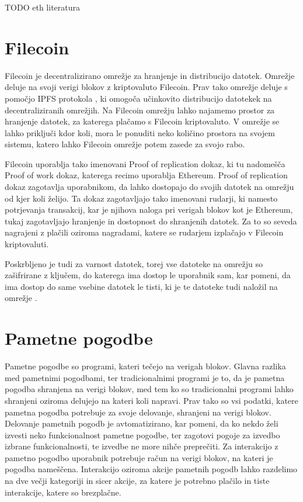 \documentclass[a4paper,12pt,openright]{book}
\begin{document}
TODO eth literatura

\section{Filecoin}
Filecoin je decentralizirano omrežje za hranjenje in distribucijo datotek.
Omrežje deluje na svoji verigi blokov z kriptovaluto Filecoin.
Prav tako omrežje deluje s pomočjo IPFS protokola \cite{IPFS}, ki omogoča učinkovito distribucijo datotekek na decentraliziranih omrežjih.
Na Filecoin omrežju lahko najamemo prostor za hranjenje datotek, za katerega plačamo s Filecoin kriptovaluto.
V omrežje se lahko priključi kdor koli, mora le ponuditi neko količino prostora na svojem sistemu, katero lahko Filecoin omrežje potem zasede za svojo rabo.

Filecoin uporablja tako imenovani Proof of replication dokaz, ki tu nadomešča Proof of work dokaz, katerega recimo uporablja Ethereum.
Proof of replication dokaz zagotavlja uporabnikom, da lahko dostopajo do svojih datotek na omrežju od kjer koli želijo.
Ta dokaz zagotavljajo tako imenovani rudarji, ki namesto potrjevanja transakcij, kar je njihova naloga pri verigah blokov kot je Ethereum, tukaj
zagotavljajo hranjenje in dostopnost do shranjenih datotek.
Za to so seveda nagrajeni z plačili oziroma nagradami, katere se rudarjem izplačajo v Filecoin kriptovaluti.

Poskrbljeno je tudi za varnost datotek, torej vse datoteke na omrežju so zašifrirane z ključem, do katerega ima dostop le uporabnik sam, kar pomeni, 
da ima dostop do same vsebine datotek le tisti, ki je te datoteke tudi naložil na omrežje \cite{filecoin}.

\section{Pametne pogodbe}
Pametne pogodbe so programi, kateri tečejo na verigah blokov.
Glavna razlika med pametnimi pogodbami, ter tradicionalnimi programi je to, da je pametna pogodba shranjena na verigi blokov, med tem ko so tradicionalni programi lahko shranjeni oziroma delujejo na kateri koli napravi.
Prav tako so vsi podatki, katere pametna pogodba potrebuje za svoje delovanje, shranjeni na verigi blokov.
Delovanje pametnih pogodb je avtomatizirano, kar pomeni, da ko nekdo želi izvesti neko funkcionalnost pametne pogodbe, ter zagotovi pogoje za izvedbo izbrane funkcionalnosti, te izvedbe ne more nihče preprečiti.
Za interakcijo z pametno pogodbo uporabnik potrebuje račun na verigi blokov, na kateri je pogodba nameščena.
Interakcijo oziroma akcije pametnih pogodb lahko razdelimo na dve večji kategoriji in sicer akcije, za katere je potrebno plačilo in tiste interakcije, katere so brezplačne.
\end{document}
